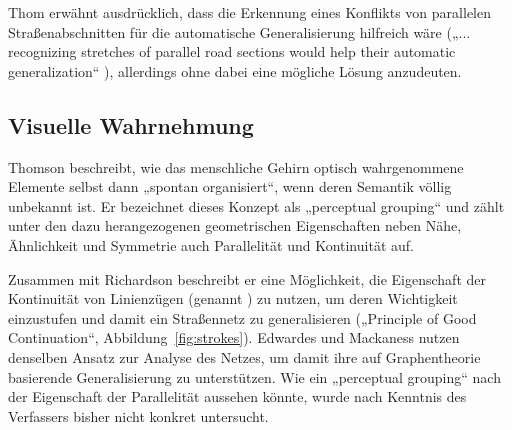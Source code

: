 \documentclass[../main/thesis.tex]{subfiles}
\begin{document}
Thom erwähnt ausdrücklich, dass die Erkennung eines Konflikts von parallelen Straßenabschnitten für die automatische Generalisierung hilfreich wäre („... recognizing stretches of parallel road sections would help their automatic generalization“ ), allerdings ohne dabei eine mögliche Lösung anzudeuten.


\subsection{Visuelle Wahrnehmung}


Thomson beschreibt, wie das menschliche Gehirn optisch wahrgenommene Elemente selbst dann „spontan organisiert“, wenn deren Semantik völlig unbekannt ist.
Er bezeichnet dieses Konzept als „perceptual grouping“ und zählt unter den dazu herangezogenen geometrischen Eigenschaften neben Nähe, Ähnlichkeit und Symmetrie auch Parallelität und Kontinuität auf. 


Zusammen mit Richardson beschreibt er eine Möglichkeit, die Eigenschaft der Kontinuität von Linienzügen (genannt ) zu nutzen, um deren Wichtigkeit einzustufen und damit ein Straßennetz zu generalisieren („Principle of Good Continuation“, Abbildung~\ref{fig:strokes}). 
Edwardes und Mackaness nutzen denselben Ansatz zur Analyse des Netzes, um damit ihre auf Graphentheorie basierende Generalisierung zu unterstützen. 
Wie ein „perceptual grouping“ nach der Eigenschaft der Parallelität aussehen könnte, wurde nach Kenntnis des Verfassers bisher nicht konkret untersucht.

\end{document}
